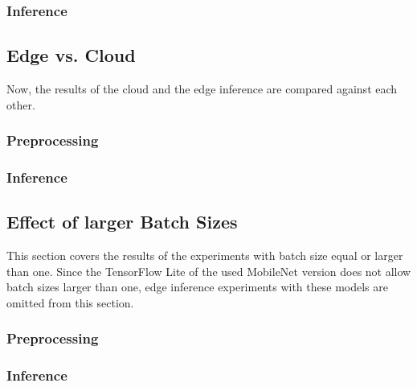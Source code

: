 \subsubsection{Inference}
\subsection{Edge vs. Cloud}
Now, the results of the cloud and the edge inference are compared against each other.
\subsubsection{Preprocessing}
\subsubsection{Inference}

\subsection{Effect of larger Batch Sizes}
This section covers the results of the experiments with batch size equal or larger than one. Since the TensorFlow Lite of the used MobileNet version does not allow batch sizes larger than one, edge inference experiments with these models are omitted from this section.
\subsubsection{Preprocessing}
\subsubsection{Inference}




\endinput 

